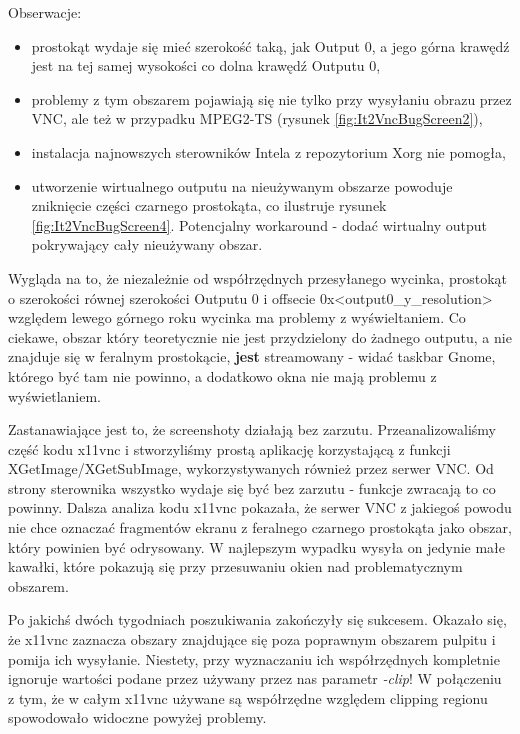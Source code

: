     \pagebreak
    Obserwacje:
    \begin{itemize}
      \item prostokąt wydaje się mieć szerokość taką, jak Output 0, a jego górna krawędź jest na tej samej wysokości co dolna krawędź Outputu 0,
      \item problemy z tym obszarem pojawiają się nie tylko przy wysyłaniu obrazu przez VNC, ale też w przypadku MPEG2-TS (rysunek \ref{fig:It2VncBugScreen2}),
      \item instalacja najnowszych sterowników Intela z repozytorium Xorg nie pomogła,
     \item utworzenie wirtualnego outputu na nieużywanym obszarze powoduje zniknięcie części czarnego prostokąta, co ilustruje rysunek \ref{fig:It2VncBugScreen4}. Potencjalny workaround - dodać wirtualny output pokrywający cały nieużywany obszar.
    \end{itemize}


    Wygląda na to, że niezależnie od współrzędnych przesyłanego wycinka, prostokąt o szerokości równej szerokości Outputu 0 i offsecie 0x<output0\_y\_resolution> względem lewego górnego roku wycinka ma problemy z wyświeltaniem. Co ciekawe, obszar który teoretycznie nie jest przydzielony do żadnego outputu, a nie znajduje się w feralnym prostokącie, \textbf{jest} streamowany - widać taskbar Gnome, którego być tam nie powinno, a dodatkowo okna nie mają problemu z wyświetlaniem.
    \vfill

    Zastanawiające jest to, że screenshoty działają bez zarzutu. Przeanalizowaliśmy część kodu x11vnc i stworzyliśmy prostą aplikację korzystającą z funkcji XGetImage/XGetSubImage, wykorzystywanych również przez serwer VNC. Od strony sterownika wszystko wydaje się być bez zarzutu - funkcje zwracają to co powinny. Dalsza analiza kodu x11vnc pokazała, że serwer VNC z jakiegoś powodu nie chce oznaczać fragmentów ekranu z feralnego czarnego prostokąta jako obszar, który powinien być odrysowany. W najlepszym wypadku wysyła on jedynie małe kawałki, które pokazują się przy przesuwaniu okien nad problematycznym obszarem.

    Po jakichś dwóch tygodniach poszukiwania zakończyły się sukcesem. Okazało się, że x11vnc zaznacza obszary znajdujące się poza poprawnym obszarem pulpitu i pomija ich wysyłanie. Niestety, przy wyznaczaniu ich współrzędnych kompletnie ignoruje wartości podane przez używany przez nas parametr \emph{-clip}! W połączeniu z tym, że w całym x11vnc używane są współrzędne względem clipping regionu spowodowało widoczne powyżej problemy.

